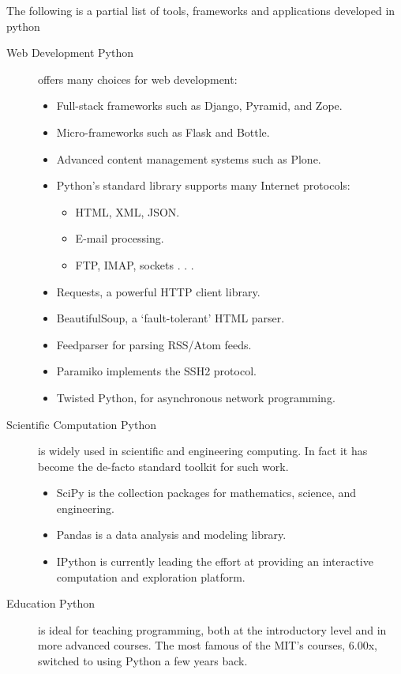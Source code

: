 \documentclass[]{book}
\begin{document}
    The following is a partial list of tools, frameworks and applications developed in python
    \begin{description}
        \item [Web Development Python] offers many choices for web development:
        \begin{itemize}
            \item Full-stack frameworks such as Django, Pyramid, and Zope.
            \item Micro-frameworks such as Flask and Bottle.
            \item Advanced content management systems such as Plone.
            \item Python’s standard library supports many Internet protocols:
                \begin{itemize}
                    \item HTML, XML, JSON.
                    \item E-mail processing.
                    \item FTP, IMAP, sockets . . .
                \end{itemize}
            \item Requests, a powerful HTTP client library.
            \item BeautifulSoup, a ‘fault-tolerant’ HTML parser.
            \item Feedparser for parsing RSS/Atom feeds.
            \item Paramiko implements the SSH2 protocol.
            \item Twisted Python, for asynchronous network programming.
        \end{itemize}
    \item [Scientific Computation Python] is widely used in scientific and engineering computing. In fact it has become the de-facto standard toolkit for such work.
        \begin{itemize}
            \item SciPy is the collection packages for mathematics, science, and engineering.
            \item Pandas is a data analysis and modeling library.
            \item IPython is currently leading the effort at providing an interactive computation and exploration platform.
        \end{itemize}
    \item [Education Python] is ideal for teaching programming, both at the introductory level and in more advanced courses. The most famous of the MIT’s courses, 6.00x, switched to using Python a few years back.

\end{description}
\end{document}
